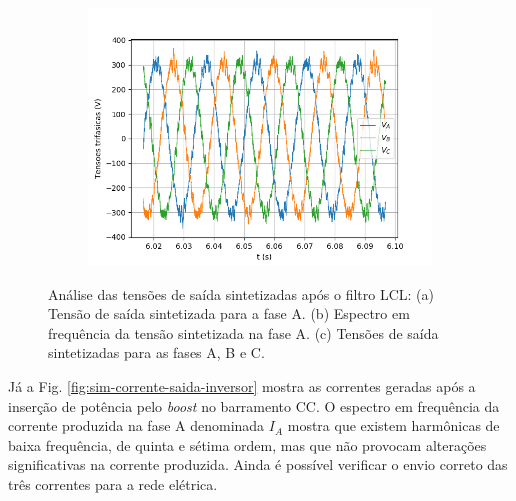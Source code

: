 \begin{figure}[!hbt]
\begin{subfigure}[b]{0.49\textwidth}
		\caption{}
   \end{subfigure}
	\begin{subfigure}[b]{0.49\textwidth}
	\centering
		\includegraphics[width=\textwidth]{figuras/sim_figures/inversor_e_boost/tensao_va_vb_vc.png}
		\caption{}
	\end{subfigure}
    \caption{Análise das tensões de saída sintetizadas após o filtro LCL: (a) Tensão de saída sintetizada para a fase A. (b) Espectro em frequência da tensão sintetizada na fase A. (c) Tensões de saída sintetizadas para as fases A, B e C.}
    \label{fig:sim-tensao-saida-inversor}
\end{figure}

Já a Fig. \ref{fig:sim-corrente-saida-inversor} mostra as correntes geradas após a inserção de potência 
pelo \textit{boost} no barramento CC.
O espectro em frequência da corrente produzida na fase A denominada $I_A$ mostra que existem 
harmônicas de baixa frequência, de quinta e sétima ordem, mas que não provocam alterações 
significativas na corrente produzida. Ainda é possível verificar o envio correto das três 
correntes para a rede elétrica.

